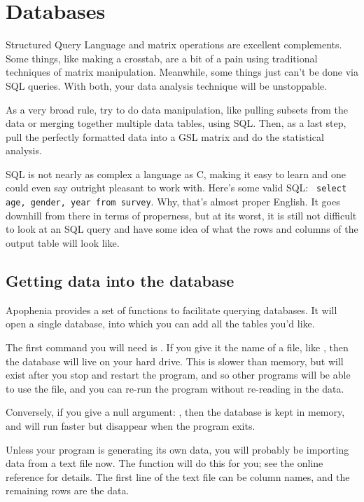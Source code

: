 \chapter{Databases} \label{sql}

Structured Query Language and matrix operations are excellent complements. Some things, like
making a crosstab, are a bit of a pain using traditional techniques of
matrix manipulation. Meanwhile, some things just can't be done via SQL
queries. With both, your data analysis technique will be unstoppable.

As a very broad rule, try to do data manipulation, like pulling subsets
from the data or merging together multiple data tables, using SQL. Then,
as a last step, pull the perfectly formatted data into a GSL matrix and
do the statistical analysis. 

SQL is not nearly as complex a language as C, making it easy to learn
and one could even say outright pleasant to work with. Here's some valid SQL: {\tt
select age, gender, year from survey}. Why, that's almost proper English. It
goes downhill from there in terms of properness, but at its worst, it is
still not difficult to look at an SQL query and have some idea of what
the rows and columns of the output table will look like.

\section{Getting data into the database}
Apophenia provides a set of functions to facilitate querying databases.
It will open a single database, into which you can add all the tables you'd like.

The first command you will need is . If you give
it the name of a file, like , then the
database will live on your hard drive. This is slower than memory, but
will exist after you stop and restart the program, and so other programs
will be able to use the file, and you can re-run the program without
re-reading in the data.

Conversely, if you give a null argument: ,
then the database is kept in memory, and will run faster but 
disappear when the program exits.


Unless your program is generating its own data, you will probably
be importing data from a text file now.  The 
function will do this for you; see the online reference for details. The
first line of the text file can be column names, and the remaining rows
are the data.


